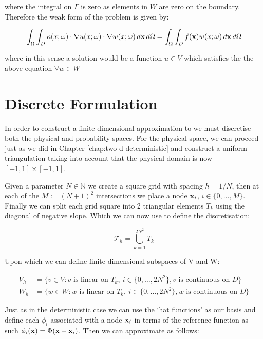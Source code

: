 where the integral on $\Gamma$ is zero as elements in $W$ are zero on the
boundary. Therefore the weak form of the problem is given by:

\begin{equation}\label{eq:wk-twod-stochastic}
    \int_{\Omega}\int_D\kappa(x;\omega)\cdot\nabla u(x;\omega)\cdot\nabla
    w(x;\omega)\, d\mathbf{x}\, d\Omega =
    \int_{\Omega}\int_D f(\mathbf{x})w(x;\omega)\, d\mathbf{x}\, d\Omega
\end{equation}

where in this sense a solution would be a function $u \in V$ which satisfies
the the above equation $\forall w \in W$

\section{Discrete Formulation}

In order to construct a finite dimensional approximation to
 we must discretise both the physical and probability
spaces. For the physical space, we can proceed just as we did in Chapter
\ref{chap:two-d-deterministic} and construct a uniform triangulation taking
into account that the physical domain is now $[-1,1] \times [-1,1]$.

Given a parameter $N \in \mathbb{N}$ we create a
square grid with spacing $h = 1/N$, then at each of the $M := (N+1)^2$
intersections we place a node $\mathbf{x}_i$, $i \in \{0,\ldots, M\}$. Finally we
can split each grid square into 2 triangular elements $T_k$ using the diagonal
of negative slope. Which we can now use to define the discretisation:

\[
    \mathcal{T}_h = \bigcup_{k=1}^{2N^2}T_k
\]

Upon which we can define finite dimensional subspaces of V and W:

\begin{align*}
    V_h &= \{v \in V: v \text{ is linear on } T_k,\ i \in \{0, \ldots, 2N^2\},
                      v \text{ is continuous on } D\} \\
    W_h &= \{w \in W: w \text{ is linear on } T_k,\ i \in \{0, \ldots, 2N^2\},
                      w \text{ is continuous on } D\}
\end{align*}

Just as in the deterministic case we can use the `hat functions' as our basis
and define each $\phi_i$ associated with a node $\mathbf{x}_i$ in terms of the
reference function  as such
$\phi_i(\mathbf{x}) = \Phi(\mathbf{x} - \mathbf{x}_i)$. Then we can approximate as follows:

